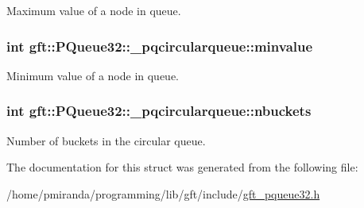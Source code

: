 Maximum value of a node in queue. 

\subsubsection[{\texorpdfstring{minvalue}{minvalue}}]{\setlength{\rightskip}{0pt plus 5cm}int gft\+::\+P\+Queue32\+::\+\_\+pqcircularqueue\+::minvalue}\hypertarget{structgft_1_1PQueue32_1_1__pqcircularqueue_a98c5d1ecaf33142d7eac03f97485d4d7}{}\label{structgft_1_1PQueue32_1_1__pqcircularqueue_a98c5d1ecaf33142d7eac03f97485d4d7}


Minimum value of a node in queue. 

\subsubsection[{\texorpdfstring{nbuckets}{nbuckets}}]{\setlength{\rightskip}{0pt plus 5cm}int gft\+::\+P\+Queue32\+::\+\_\+pqcircularqueue\+::nbuckets}\hypertarget{structgft_1_1PQueue32_1_1__pqcircularqueue_a622d6ecf851ae51f149bfd4cb8ba66e3}{}\label{structgft_1_1PQueue32_1_1__pqcircularqueue_a622d6ecf851ae51f149bfd4cb8ba66e3}


Number of buckets in the circular queue. 



The documentation for this struct was generated from the following file\+:\begin{DoxyCompactItemize}
\item 
/home/pmiranda/programming/lib/gft/include/\hyperlink{gft__pqueue32_8h}{gft\+\_\+pqueue32.\+h}\end{DoxyCompactItemize}
